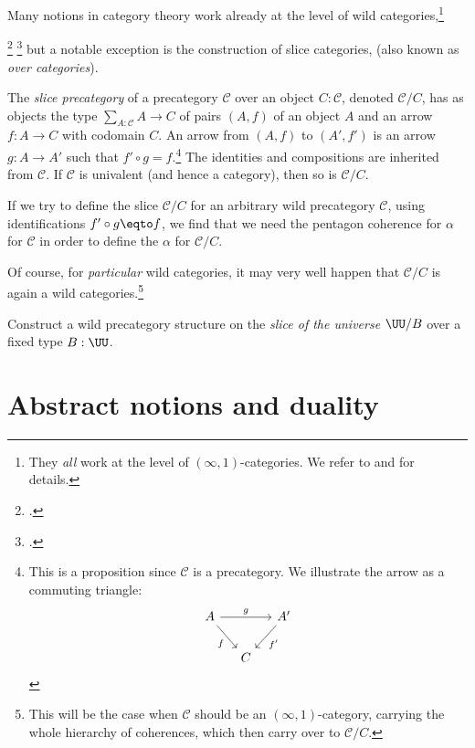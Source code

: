 Many notions in category theory work already at the level of wild categories,\footnote{%
  They \emph{all} work at the level of $(\infty,1)$-categories.
  We refer to \citeauthor{LurieHTT}\footnotemark{} and
  \citeauthor{LandInftyCat}\footnotemark{} for details.}%
\addtocounter{footnote}{-1}\footcitetext{LurieHTT}%
\footcitetext{LandInftyCat}
but a notable exception is the construction of slice categories,
(also known as \emph{over categories}).
\begin{example}\label{def:slice-cat}
  The \emph{slice precategory} of a precategory $\mathcal C$ over an object $C : \mathcal{C}$,
  denoted $\mathcal C/C$,
  has as objects the type $\sum_{A:\mathcal C}A \to C$ of pairs $(A,f)$ of an object $A$ and an arrow $f:A\to C$
  with codomain $C$.
  An arrow from $(A,f)$ to $(A',f')$ is an arrow $g : A \to A'$ such that $f' \circ g=f$.\footnote{%
    This is a proposition since $\mathcal C$ is a precategory. We illustrate the arrow as
    a commuting triangle:
    \[
      \begin{tikzcd}[ampersand replacement=\&,column sep=small]
        A \ar[dr,"f"']\ar[rr,"g"] \& \& A' \ar[dl,"f'"] \\
        \& C \&
      \end{tikzcd}
    \]}
  The identities and compositions are inherited from $\mathcal C$.
  If $\mathcal C$ is univalent (and hence a category), then so is $\mathcal C/C$.

  If we try to define the slice $\mathcal C/C$ for an arbitrary wild precategory $\mathcal C$,
  using identifications $f' \circ g \eqto f$, we find that we need the pentagon coherence
  for $\alpha$ for $\mathcal C$ in order to define the $\alpha$ for $\mathcal C/C$.

  Of course, for \emph{particular} wild categories, it may very well happen
  that $\mathcal C/C$ is again a wild categories.\footnote{%
    This will be the case when $\mathcal C$ should be an $(\infty,1)$-category,
    carrying the whole hierarchy of coherences, which then
    carry over to $\mathcal C/C$.}
\end{example}
\begin{xca}\label{xca:univ-slice-cat}
  Construct a wild precategory structure on the \emph{slice of the universe} $\UU/B$
  over a fixed type $B:\UU$.
\end{xca}

\section{Abstract notions and duality}
\label{sec:duality}

